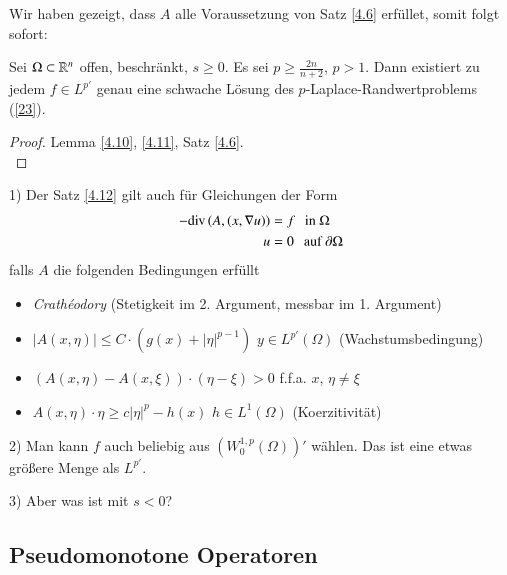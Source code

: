 Wir haben gezeigt, dass $A$ alle Voraussetzung von Satz \ref{4.6} erfüllet, somit folgt sofort:

\begin{theorem}\label{4.12}
    Sei $\Omega\subset\mathbb{R}^n$ offen, beschränkt, $s\geq 0$. Es sei $p\geq  \frac{2n}{n+2}$, $p>1$. Dann
    existiert zu jedem $f\in L^{p'}$ genau eine schwache Lösung des $p$-Laplace-Randwertproblems
    (\ref{23}).
\end{theorem}

\begin{proof}
    Lemma \ref{4.10}, \ref{4.11}, Satz \ref{4.6}.
    \[ \]
\end{proof}

\begin{remark}
    \begin{description}
        \item{1)}
        Der Satz \ref{4.12} gilt auch für Gleichungen der Form
        \begin{align*}
            -\mathrm{div}\,(A,(x,\nabla u))&=f \hspace{.25cm} \text{in } \Omega\\
                        u&=0 \hspace{.25cm} \text{auf }\partial\Omega
        \end{align*}
        falls $A$ die folgenden Bedingungen erfüllt
        \begin{itemize}
            \item \textit{Crathéodory} (Stetigkeit im 2. Argument, messbar im 1. Argument)
            \item  $|A(x,\eta)|\leq C\cdot (g(x)+ |\eta|^{p-1})$ $y\in L^{p'}(\Omega)$
                (Wachstumsbedingung)
            \item $(A(x,\eta)- A(x,\xi))\cdot (\eta-\xi)>0$ f.f.a. $x$, $\eta\neq \xi$
            \item $A(x,\eta)\cdot\eta\geq c|\eta|^p-h(x)$ $h\in L^1(\Omega)$ (Koerzitivität)
        \end{itemize}
        \item{2)}
        Man kann $f$ auch beliebig aus $(W_0^{1,p}(\Omega))'$ wählen. Das ist eine etwas größere Menge
        als $L^{p'}$.
        \item{3)} Aber was ist mit $s<0$?
    \end{description}
\end{remark}

\subsection{Pseudomonotone Operatoren}

